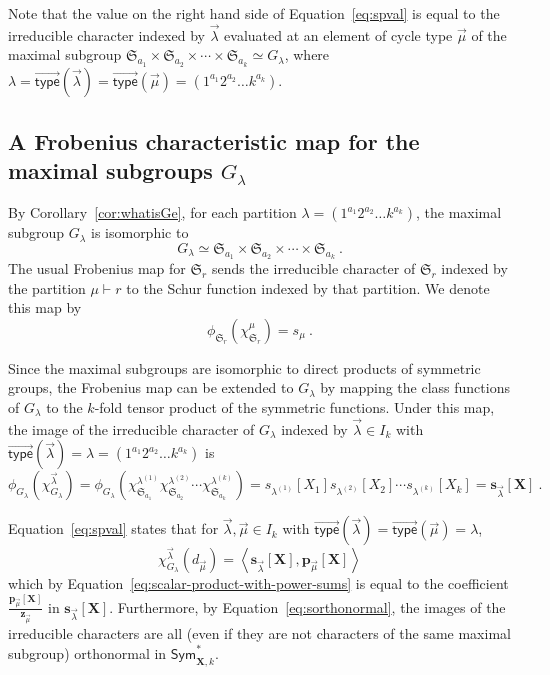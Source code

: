 \documentclass[ALCO,Unicode]{cedram}
\newcommand{\vtype}{\overrightarrow{\mathsf{type}}}
\newcommand{\XXX}{\mathbf{X}}
\begin{document}
Note that the value on the right hand side of Equation~\eqref{eq:spval}
is equal to the irreducible character indexed by $\vec{\lambda}$
evaluated at an element of cycle type $\vec{\mu}$ of the maximal subgroup
$\mathfrak{S}_{a_1} \times \mathfrak{S}_{a_2} \times \cdots \times \mathfrak{S}_{a_k} \simeq
G_\lambda$, where $\lambda = \vtype(\vec{\lambda}) = \vtype(\vec{\mu})=(1^{a_1} 2^{a_2} \ldots k^{a_k})$.

\subsection{A Frobenius characteristic map for the maximal subgroups $G_\lambda$}
By Corollary~\ref{cor:whatisGe},
for each partition $\lambda = (1^{a_1}2^{a_2}\ldots k^{a_k})$,
the maximal subgroup $G_\lambda$ is isomorphic to
\[
    G_\lambda \simeq
    \mathfrak{S}_{a_1} \times \mathfrak{S}_{a_2} \times \cdots \times \mathfrak{S}_{a_k}~.
\]
The usual Frobenius map for $\mathfrak{S}_r$ sends the irreducible character of $\mathfrak{S}_r$
indexed by the partition $\mu \vdash r$ to the Schur function indexed
by that partition.  We denote this map by
\[
    \phi_{\mathfrak{S}_r}( \chi^\mu_{\mathfrak{S}_r} ) = s_\mu~.
\]

Since the maximal subgroups are isomorphic to direct products of
symmetric groups, the Frobenius map can be extended to $G_\lambda$ by
mapping the class functions of $G_\lambda$
to the $k$-fold tensor product of the symmetric functions.
Under this map, the image of the irreducible character of $G_\lambda$ indexed by $\vec{\lambda} \in I_k$
with $\vtype(\vec{\lambda}) = \lambda = (1^{a_1}2^{a_2}\ldots k^{a_k})$
is
\[
    \phi_{G_\lambda}\left( \chi^{\vec{\lambda}}_{G_\lambda}\right) =
    \phi_{G_\lambda}\left( \chi^{\lambda^{(1)}}_{\mathfrak{S}_{a_1}}
    \chi^{\lambda^{(2)}}_{\mathfrak{S}_{a_2}}
    \cdots
    \chi^{\lambda^{(k)}}_{\mathfrak{S}_{a_k}} \right)
    = s_{\lambda^{(1)}}[X_1] s_{\lambda^{(2)}}[X_2] \cdots s_{\lambda^{(k)}}[X_k]
    = \mathbf{s}_{\vec{\lambda}}[\XXX]~.
\]

Equation~\eqref{eq:spval} states that for $\vec{\lambda}, \vec{\mu} \in I_k$
with $\vtype(\vec{\lambda}) = \vtype(\vec{\mu}) = \lambda$,
\[
    \chi^{\vec{\lambda}}_{G_\lambda}( d_{\vec{\mu}})
    = \left< \mathbf{s}_{\vec{\lambda}}[\XXX], \mathbf{p}_{\vec{\mu}}[\XXX]\right>
\]
which by Equation~\eqref{eq:scalar-product-with-power-sums} is equal to the coefficient
$\frac{\mathbf{p}_{\vec{\mu}}[\XXX]}{\mathbf{z}_{\vec{\mu}}}$
in $\mathbf{s}_{\vec{\lambda}}[\XXX]$.
Furthermore, by Equation~\eqref{eq:sorthonormal}, the images
of the irreducible characters are all (even if they are not
characters of the same maximal subgroup)
orthonormal in $\mathsf{Sym}^{\ast}_{\XXX,k}$.
\end{document}
